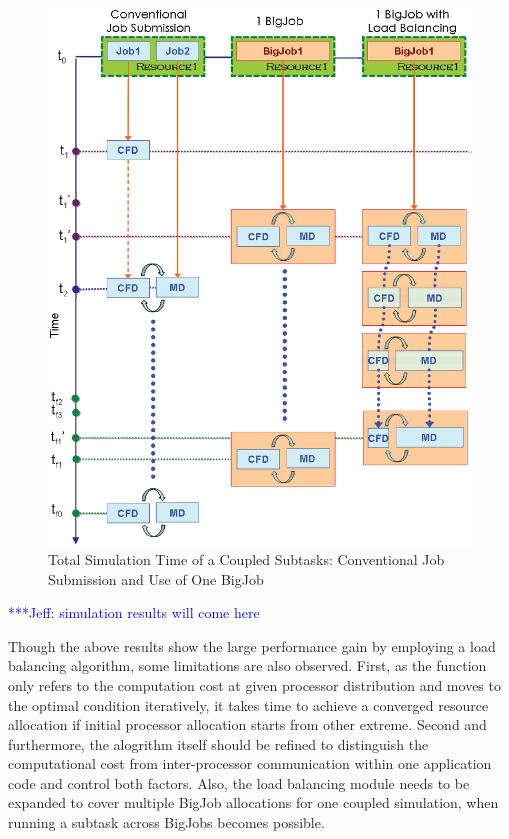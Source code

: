 \documentclass[conference,final]{IEEEtran}
\newcommand{\skonote}[1]{ {\textcolor{blue} { ***Jeff: #1 }}}
\newcommand{\skonote}[1]{}
\begin{document}
\begin{figure}
\centering
\includegraphics[scale=0.40]{Simulation_Time_of_One_BigJob.eps}
\caption{Total Simulation Time of a Coupled Subtasks: Conventional Job Submission and Use of One BigJob}
\end{figure}

\skonote{simulation results will come here}

Though the above results show the large performance gain by employing a load balancing algorithm, some limitations are also observed. First, as the function only refers to the computation cost at given processor distribution and moves to the optimal condition iteratively, it takes time to achieve a converged resource allocation if initial processor allocation starts from other extreme. Second and furthermore, the alogrithm itself should be refined to distinguish the computational cost from inter-processor communication within one application code and control both factors. Also, the load balancing module needs to be expanded to cover multiple BigJob allocations for one coupled simulation, when running a subtask across BigJobs becomes possible.
\end{document}
